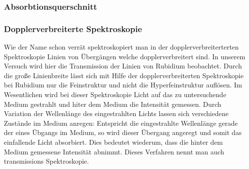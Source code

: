 \documentclass[12pt]{article}
\begin{document}
\subsubsection{Absorbtionsquerschnitt}

\subsubsection{Dopplerverbreiterte Spektroskopie}
Wie der Name schon verrät spektroskopiert man in der dopplerverbreiterterten Spektroskopie Linien von Übergängen welche
dopplerverbreitert sind. In unserem Versuch wird hier die Transmission der Linien von Rubidium beobachtet. Durch die große
Linienbreite lässt sich mit Hilfe der dopplerverbreiterten Spektroskopie  bei Rubidium nur die Feinstruktur und nicht die
Hyperfeinstruktur auflösen. Im Wesentlichen wird bei dieser Spektroskopie Licht auf das zu untersuchende Medium gestrahlt und hiter dem Medium die Intensität gemessen. Durch Variation der Wellenlänge des eingestrahlten Lichts lassen sich verschiedene Zustände im Medium anregen: Entspricht die eingestrahlte Wellenlänge gerade der eines Übgangs im Medium, so wird dieser Übergang angeregt und somit das einfallende Licht absorbiert. Dies bedeutet wiederum, dass die hinter dem Medium gemessene Intensität abnimmt. Dieses Verfahren nennt man auch transmissions Spektroskopie.
\end{document}
